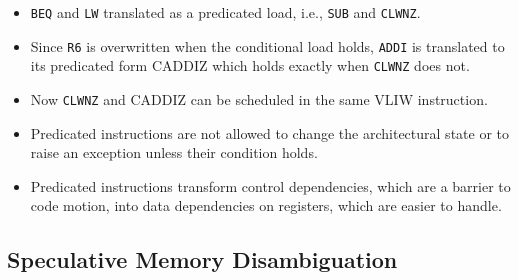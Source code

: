 \documentclass{beamer}
\renewcommand{\emph}[1]{\textcolor{structure}{#1}}
\newcommand{\emp}[1]{\textcolor{DikuRed}{ #1}}
\begin{document}
\begin{frame}[fragile,t]
\begin{scriptsize}
\begin{itemize}
    \item \emp{{\tt BEQ} and {\tt LW}} translated as a \emph{predicated load, i.e., {\tt SUB} and {\tt CLWNZ}}.
    \item Since {\tt R6} is overwritten when the conditional load holds, {\tt ADDI}
            is translated to its predicated form \emph{CADDIZ} which holds
            exactly when {\tt CLWNZ} does not.
    \item Now \emph{{\tt CLWNZ} and \emph{CADDIZ}} can be scheduled in the same VLIW instruction.
    \item Predicated instructions are not allowed to change the architectural state or to raise
            an exception unless their condition holds. 
    \item Predicated instructions transform control dependencies, which are a barrier
            to code motion, into data dependencies on registers, which are easier to handle.
\end  {itemize}
\end{scriptsize}
\end{frame}


\subsection{Speculative Memory Disambiguation}
\end{document}
